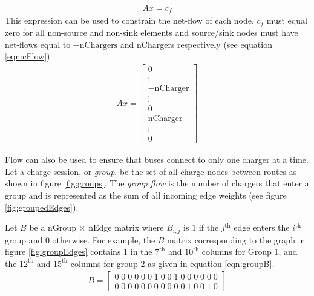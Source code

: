\begin{align}
	Ax = c_f
\end{align}
This expression can be used to constrain the net-flow of each node.  $c_f$ must equal zero for all non-source and non-sink elements and source/sink nodes must have net-flows equal to $-\text{nChargers}$ and nChargers respectively (see equation \ref{eqn:cFlow}).
\begin{align}\label{eqn:cFlow}
	Ax = \begin{bmatrix} 0 \\ \vdots \\ -\text{nCharger} \\ \vdots \\ 0 \\ \text{nCharger} \\ \vdots \\ 0\end{bmatrix}
\end{align}

\par Flow can also be used to ensure that buses connect to only one charger at a time. Let a charge session, or \textit{group}, be the set of all charge nodes between routes as shown in figure \ref{fig:groups}. The \textit{group flow} is the number of chargers that enter a group and is represented as the sum of all incoming edge weights (see figure \ref{fig:groupedEdges}). 
\par Let $B$ be a nGroup $\times$ nEdge matrix where $B_{i,j}$ is $1$ if the $j^{\text{th}}$ edge enters the $i^{\text{th}}$ group and $0$ otherwise. For example, the $B$ matrix corresponding to the graph in figure \ref{fig:groupEdges} contains $1$ in the $7^{\text{th}}$ and $10^{\text{th}}$ columns for Group 1, and the $12^{\text{th}}$ and $15^{\text{th}}$ columns for group 2 as given in equation \ref{eqn:groupB}.
\begin{align}\label{eqn:groupB}
	B = \begin{bmatrix}0 \; 0 \; 0 \; 0 \; 0 \; 0 \; 1 \; 0 \; 0 \; 1 \; 0 \; 0 \; 0 \; 0 \; 0 \; 0\\
	                   0 \; 0 \; 0 \; 0 \; 0 \; 0 \; 0 \; 0 \; 0 \; 0 \; 0 \; 1 \; 0 \; 0 \; 1 \; 0\end{bmatrix}
\end{align}

